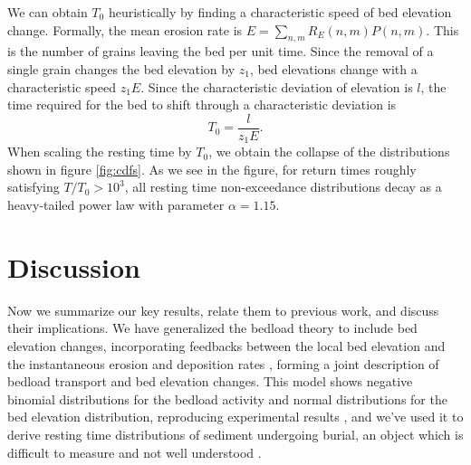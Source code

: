 \documentclass[draft]{agujournal2018}
\newcommand\be{\begin{equation}} %
\newcommand\ee{\end{equation}}   %
\begin{document}
We can obtain $T_0$ heuristically by finding a characteristic speed of bed elevation change.
Formally, the mean erosion rate is $E = \sum_{n,m}R_E(n,m)P(n,m)$.
This is the number of grains leaving the bed per unit time.
Since the removal of a single grain changes the bed elevation by $z_1$, bed elevations change with a characteristic speed $z_1 E$.
Since the characteristic deviation of elevation is $l$, the time required for the bed to shift through a characteristic deviation is
\be T_0 = \frac{l}{z_1 E}.\label{eq:time}\ee
When scaling the resting time by $T_0$, we obtain the collapse of the distributions shown in figure \ref{fig:cdfs}.
As we see in the figure, for return times roughly satisfying $T/T_0 > 10^3$, all resting time non-exceedance distributions decay as a heavy-tailed power law with parameter $\alpha = 1.15$.

\section{Discussion}

Now we summarize our key results, relate them to previous work, and discuss their implications.
We have generalized the \citet{Ancey2008} bedload theory to include bed elevation changes, incorporating feedbacks between the local bed elevation and the instantaneous erosion and deposition rates \citep[e.g.][]{Wong2007}, forming a joint description of bedload transport and bed elevation changes. 
This model shows negative binomial distributions for the bedload activity and normal distributions for the bed elevation distribution, reproducing experimental results \citep{Ancey2008, Heyman2016, Wong2007, Singh2009,Martin2014}, and we've used it to derive resting time distributions of sediment undergoing burial, an object which is difficult to measure and not well understood \citep[e.g.][]{Voepel2013,Martin2014, Bradley2017}. 
\end{document}
